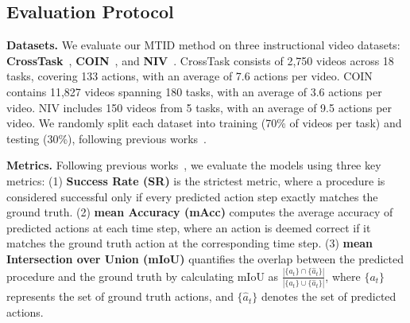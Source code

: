 
\subsection{Evaluation Protocol}
\label{sec:protocal}

\textbf{Datasets.} We evaluate our MTID method on three instructional video datasets: \textbf{CrossTask}~\citep{zhukov2019cross}, \textbf{COIN}~\citep{tang2019coin}, and \textbf{NIV}~\citep{alayrac2016unsupervised}. CrossTask consists of 2,750 videos across 18 tasks, covering 133 actions, with an average of 7.6 actions per video. COIN contains 11,827 videos spanning 180 tasks, with an average of 3.6 actions per video. NIV includes 150 videos from 5 tasks, with an average of 9.5 actions per video. We randomly split each dataset into training (70\% of videos per task) and testing (30\%), following previous works~\citep{sun2022plate, wang2023pdpp, niu2024schema}.


\textbf{Metrics.} Following previous works~\citep{sun2022plate, zhao2022p3iv, wang2023pdpp, niu2024schema, nagasinghe2024not}, we evaluate the models using three key metrics: (1) \textbf{Success Rate (SR)} is the strictest metric, where a procedure is considered successful only if every predicted action step exactly matches the ground truth. (2) \textbf{mean Accuracy (mAcc)} computes the average accuracy of predicted actions at each time step, where an action is deemed correct if it matches the ground truth action at the corresponding time step. (3) \textbf{mean Intersection over Union (mIoU)} quantifies the overlap between the predicted procedure and the ground truth by calculating mIoU as $\frac{|\{a_t\} \cap \{\hat{a}_t\}|}{|\{a_t\} \cup \{\hat{a}_t\}|}$, where $\{a_t\}$ represents the set of ground truth actions, and $\{\hat{a}_t\}$ denotes the set of predicted actions.


